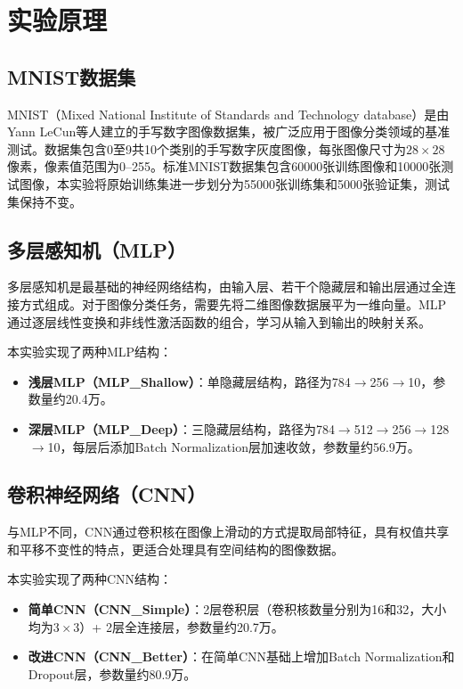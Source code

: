 \documentclass[12pt,a4paper]{ctexart}
\begin{document}
\section{实验原理}

\subsection{MNIST数据集}
MNIST（Mixed National Institute of Standards and Technology database）是由Yann LeCun等人建立的手写数字图像数据集\cite{lecun1998}，被广泛应用于图像分类领域的基准测试。数据集包含0至9共10个类别的手写数字灰度图像，每张图像尺寸为$28\times28$像素，像素值范围为0--255。标准MNIST数据集包含60000张训练图像和10000张测试图像，本实验将原始训练集进一步划分为55000张训练集和5000张验证集，测试集保持不变。

\subsection{多层感知机（MLP）}
多层感知机是最基础的神经网络结构，由输入层、若干个隐藏层和输出层通过全连接方式组成。对于图像分类任务，需要先将二维图像数据展平为一维向量。MLP通过逐层线性变换和非线性激活函数的组合，学习从输入到输出的映射关系。

本实验实现了两种MLP结构：
\begin{itemize}
  \item \textbf{浅层MLP（MLP\_Shallow）}：单隐藏层结构，路径为784$\rightarrow$256$\rightarrow$10，参数量约20.4万。
  \item \textbf{深层MLP（MLP\_Deep）}：三隐藏层结构，路径为784$\rightarrow$512$\rightarrow$256$\rightarrow$128$\rightarrow$10，每层后添加Batch Normalization\cite{ioffe2015}层加速收敛，参数量约56.9万。
\end{itemize}

\subsection{卷积神经网络（CNN）}
与MLP不同，CNN通过卷积核在图像上滑动的方式提取局部特征，具有权值共享和平移不变性的特点，更适合处理具有空间结构的图像数据。

本实验实现了两种CNN结构：
\begin{itemize}
  \item \textbf{简单CNN（CNN\_Simple）}：2层卷积层（卷积核数量分别为16和32，大小均为$3\times3$）+ 2层全连接层，参数量约20.7万。
  \item \textbf{改进CNN（CNN\_Better）}：在简单CNN基础上增加Batch Normalization和Dropout\cite{srivastava2014}层，参数量约80.9万。
\end{itemize}
\end{document}
